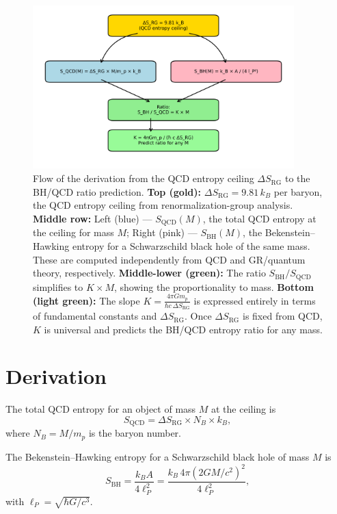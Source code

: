 \documentclass[aps,prd,onecolumn,nofootinbib,superscriptaddress]{revtex4-2}
\begin{document}
\begin{figure}[htbp]
\centering
\includegraphics[width=0.9\textwidth]{figures/flow_diagram.png}
\caption{Flow of the derivation from the QCD entropy ceiling $\Delta S_{\mathrm{RG}}$ to the BH/QCD ratio prediction. 
\textbf{Top (gold):} $\Delta S_{\mathrm{RG}} = 9.81\,k_B$ per baryon, the QCD entropy ceiling from renormalization-group analysis. 
\textbf{Middle row:} Left (blue) --- $S_{\mathrm{QCD}}(M)$, the total QCD entropy at the ceiling for mass $M$; Right (pink) --- $S_{\mathrm{BH}}(M)$, the Bekenstein--Hawking entropy for a Schwarzschild black hole of the same mass. These are computed independently from QCD and GR/quantum theory, respectively. 
\textbf{Middle-lower (green):} The ratio $S_{\mathrm{BH}}/S_{\mathrm{QCD}}$ simplifies to $K \times M$, showing the proportionality to mass. 
\textbf{Bottom (light green):} The slope $K = \frac{4\pi G m_p}{\hbar c \,\Delta S_{\mathrm{RG}}}$ is expressed entirely in terms of fundamental constants and $\Delta S_{\mathrm{RG}}$. Once $\Delta S_{\mathrm{RG}}$ is fixed from QCD, $K$ is universal and predicts the BH/QCD entropy ratio for any mass.}
\label{fig:flow}
\end{figure}


\section{Derivation}

The total QCD entropy for an object of mass $M$ at the ceiling is
\begin{equation}
S_{\mathrm{QCD}} = \Delta S_{\mathrm{RG}} \times N_B \times k_B,
\end{equation}
where $N_B = M / m_p$ is the baryon number.

The Bekenstein--Hawking entropy for a Schwarzschild black hole of mass $M$ is
\begin{equation}
S_{\mathrm{BH}} = \frac{k_B A}{4 \ell_P^2}
= \frac{k_B \, 4\pi (2GM/c^2)^2}{4 \ell_P^2},
\end{equation}
with $\ell_P = \sqrt{\hbar G / c^3}$.
\end{document}

